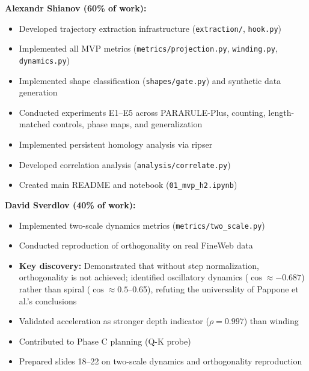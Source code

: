 \documentclass[12pt,a4paper]{article}
\begin{document}
\textbf{Alexandr Shianov (60\% of work):}
\begin{itemize}
    \item Developed trajectory extraction infrastructure (\texttt{extraction/}, \texttt{hook.py})
    \item Implemented all MVP metrics (\texttt{metrics/projection.py}, \texttt{winding.py}, \texttt{dynamics.py})
    \item Implemented shape classification (\texttt{shapes/gate.py}) and synthetic data generation
    \item Conducted experiments E1--E5 across PARARULE-Plus, counting, length-matched controls, phase maps, and generalization
    \item Implemented persistent homology analysis via ripser
    \item Developed correlation analysis (\texttt{analysis/correlate.py})
    \item Created main README and notebook (\texttt{01\_mvp\_h2.ipynb})
\end{itemize}

\textbf{David Sverdlov (40\% of work):}
\begin{itemize}
    \item Implemented two-scale dynamics metrics (\texttt{metrics/two\_scale.py})
    \item Conducted reproduction of orthogonality on real FineWeb data
    \item \textbf{Key discovery:} Demonstrated that without step normalization, orthogonality is not achieved; identified oscillatory dynamics ($\cos \approx -0.687$) rather than spiral ($\cos \approx 0.5$--0.65), refuting the universality of Pappone et al.'s conclusions
    \item Validated acceleration as stronger depth indicator ($\rho = 0.997$) than winding
    \item Contributed to Phase C planning (Q-K probe)
    \item Prepared slides 18--22 on two-scale dynamics and orthogonality reproduction
\end{itemize}
\end{document}
